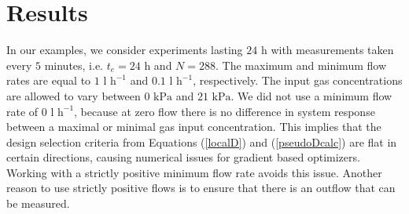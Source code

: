 \section{Results}
\label{sec_experiments}
In our examples, we consider experiments lasting $24$ h with measurements taken every $5$ minutes, i.e. $t_e = 24$ h and $N=288$. The maximum and minimum flow rates are equal to $1\text{ l h}^{-1}$ and $0.1\text{ l h}^{-1}$, respectively. The input gas concentrations are allowed to vary between $0 \text{ kPa}$ and $21\text{ kPa}$. We did not use a minimum flow rate of $0\text{ l h}^{-1}$, because at zero flow there is no difference in system response between a maximal or minimal gas input concentration. This implies that the design selection criteria from Equations (\ref{localD}) and (\ref{pseudoDcalc}) are flat in certain directions, causing numerical issues for gradient based optimizers. Working with a strictly positive minimum flow rate avoids this issue. {\color{red}Another reason to use strictly positive flows is to ensure that there is an outflow that can be measured.}

